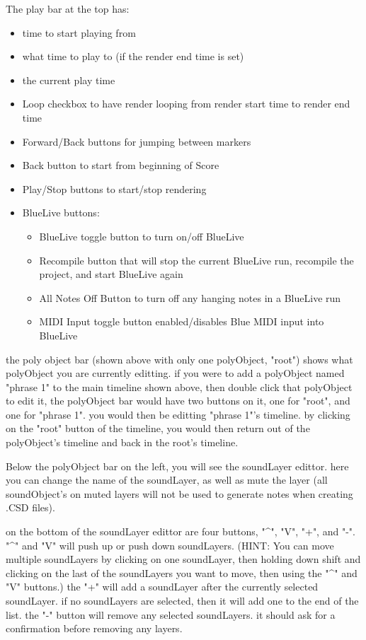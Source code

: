 The play bar at the top has:

\begin{itemize}
\tightlist
\item
  time to start playing from
\item
  what time to play to (if the render end time is set)
\item
  the current play time
\item
  Loop checkbox to have render looping from render start time to render
  end time
\item
  Forward/Back buttons for jumping between markers
\item
  Back button to start from beginning of Score
\item
  Play/Stop buttons to start/stop rendering
\item
  BlueLive buttons:

  \begin{itemize}
  \tightlist
  \item
    BlueLive toggle button to turn on/off BlueLive
  \item
    Recompile button that will stop the current BlueLive run, recompile
    the project, and start BlueLive again
  \item
    All Notes Off Button to turn off any hanging notes in a BlueLive run
  \item
    MIDI Input toggle button enabled/disables Blue MIDI input into
    BlueLive
  \end{itemize}
\end{itemize}

the poly object bar (shown above with only one polyObject, "root") shows
what polyObject you are currently editting. if you were to add a
polyObject named "phrase 1" to the main timeline shown above, then
double click that polyObject to edit it, the polyObject bar would have
two buttons on it, one for "root", and one for "phrase 1". you would
then be editting "phrase 1"'s timeline. by clicking on the "root" button
of the timeline, you would then return out of the polyObject's timeline
and back in the root's timeline.

Below the polyObject bar on the left, you will see the soundLayer
edittor. here you can change the name of the soundLayer, as well as mute
the layer (all soundObject's on muted layers will not be used to
generate notes when creating .CSD files).

on the bottom of the soundLayer edittor are four buttons, "\^{}", "V",
"+", and "-". "\^{}" and "V" will push up or push down soundLayers.
(HINT: You can move multiple soundLayers by clicking on one soundLayer,
then holding down shift and clicking on the last of the soundLayers you
want to move, then using the "\^{}" and "V" buttons.) the "+" will add a
soundLayer after the currently selected soundLayer. if no soundLayers
are selected, then it will add one to the end of the list. the "-"
button will remove any selected soundLayers. it should ask for a
confirmation before removing any layers.

